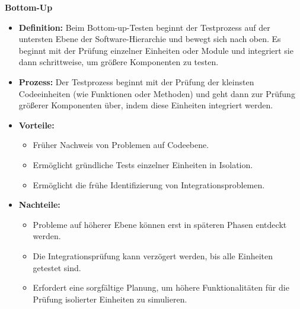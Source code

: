 \textbf{Bottom-Up}
\begin{itemize}
	\item \textbf{Definition:} Beim Bottom-up-Testen beginnt der Testprozess auf der untersten Ebene der Software-Hierarchie und bewegt sich nach oben. Es beginnt mit der Prüfung einzelner Einheiten oder Module und integriert sie dann schrittweise, um größere Komponenten zu testen.
	\item \textbf{Prozess:} Der Testprozess beginnt mit der Prüfung der kleinsten Codeeinheiten (wie Funktionen oder Methoden) und geht dann zur Prüfung größerer Komponenten über, indem diese Einheiten integriert werden.
	\item \textbf{Vorteile:}
	\begin{itemize}
		\item Früher Nachweis von Problemen auf Codeebene.
		\item Ermöglicht gründliche Tests einzelner Einheiten in Isolation.
		\item Ermöglicht die frühe Identifizierung von Integrationsproblemen.
	\end{itemize}
	\item \textbf{Nachteile:}
	\begin{itemize}
		\item Probleme auf höherer Ebene können erst in späteren Phasen entdeckt werden.
		\item Die Integrationsprüfung kann verzögert werden, bis alle Einheiten getestet sind.
		\item Erfordert eine sorgfältige Planung, um höhere Funktionalitäten für die Prüfung isolierter Einheiten zu simulieren.
	\end{itemize}
\end{itemize}
